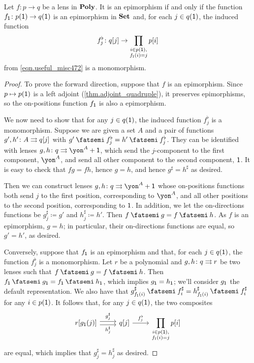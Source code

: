 \documentclass[Book-Poly]{subfiles}
\begin{document}
\begin{proposition}\label{prop.epis_in_poly}
Let $f \colon p \to q$ be a lens in $\mathbf{Poly}$. It is an epimorphism if and only if the function $f_{\textsf{1}} \colon p(\textsf{1}) \to q(\textsf{1})$ is an epimorphism in $\mathbf{Set}$ and, for each $j\in q(\textsf{1})$, the induced function
\[
    f^\flat_j \colon q[j] \to \prod_{\substack{i\in p(\textsf{1}), \\ f_{\textsf{1}}(i)=j}} p[i]
\]
from \eqref{eqn.useful_misc472} is a monomorphism.
\end{proposition}
\begin{proof}
To prove the forward direction, suppose that $f$ is an epimorphism. Since $p \mapsto p(\textsf{1})$ is a left adjoint (\cref{thm.adjoint_quadruple}), it preserves epimorphisms, so the on-positions function $f_{\textsf{1}}$ is also a epimorphism.

We now need to show that for any $j\in q(\textsf{1})$, the induced function $f^\flat_j$ is a monomorphism.
Suppose we are given a set $A$ and a pair of functions $g',h'\colon A\rightrightarrows q[j]$ with $g' \then f^\flat_j = h' \then f^\flat_j$.
They can be identified with lenses $g,h\colon q\tto \yon^A+\1$, which send the $j$-component to the first component, $\yon^A$, and send all other component to the second component, $\textsf{1}$. It is easy to check that $fg=fh$, hence $g=h$, and hence $g^\sharp=h^\sharp$ as desired.

Then we can construct lenses $g,h \colon q \tto \yon^A+\1$ whose on-positions functions both send $j$ to the first position, corresponding to $\yon^A$, and all other positions to the second position, corresponding to $\textsf{1}$.
In addition, we let the on-directions functions be $g^\sharp_j \coloneqq g'$ and $h^\sharp_j \coloneqq h'$.
Then $f \then g = f \then h$.
As $f$ is an epimorphism, $g = h$; in particular, their on-directions functions are equal, so $g' = h'$, as desired.

Conversely, suppose that $f_{\textsf{1}}$ is an epimorphism and that, for each $j\in q(\textsf{1})$, the function $f^\flat_j$ is a monomorphism.
Let $r$ be a polynomial and $g,h\colon q\rightrightarrows r$ be two lenses such that $f \then g = f \then h$.
Then $f_\1 \then g_\1 = f_\1 \then h_\1$, which implies $g_{\textsf{1}}=h_{\textsf{1}}$; we'll consider $g_{\textsf{1}}$ the default representation.
We also have that $g^\sharp_{f_\1(i)} \then f^\sharp_i = h^\sharp_{f_\1(i)} \then f^\sharp_i$ for any $i\in p(\textsf{1})$.
It follows that, for any $j \in q(\textsf{1})$, the two composites
\[
\begin{tikzcd}
	r[g_\1(j)] \ar[r, shift left, "g^\sharp_j"] \ar[r, shift right, "h^\sharp_j"'] & q[j] \ar[r, "f^\flat_j"] & \displaystyle\prod_{\substack{i\in p(\1), \\ f_\1(i)=j}} p[i]
\end{tikzcd}
\]
are equal, which implies that $g^\sharp_j=h^\sharp_j$ as desired.
\end{proof}
\end{document}
